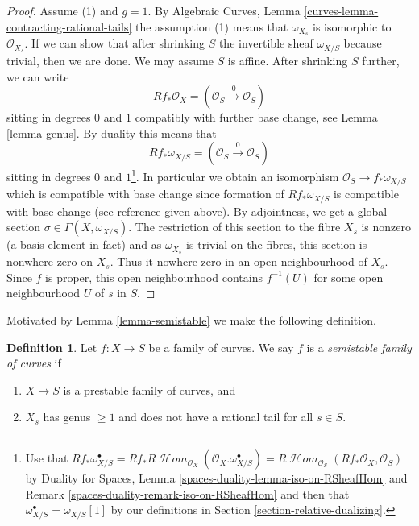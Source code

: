\documentclass{stacks-project}
\theoremstyle{plain}
\theoremstyle{definition}
\newtheorem{definition}[subsection]{Definition}
\theoremstyle{remark}
\numberwithin{equation}{subsection}
\def\SheafHom{\mathop{\mathcal{H}\!\mathit{om}}\nolimits}
\begin{document}
\begin{proof}
\medskip\noindent
Assume (1) and $g = 1$. By
Algebraic Curves, Lemma \ref{curves-lemma-contracting-rational-tails}
the assumption (1) means that $\omega_{X_s}$ is isomorphic to
$\mathcal{O}_{X_s}$. If we can show that after shrinking $S$
the invertible sheaf $\omega_{X/S}$ because trivial, then
we are done. We may assume $S$ is affine. After shrinking $S$
further, we can write
$$
Rf_*\mathcal{O}_X = (\mathcal{O}_S \xrightarrow{0} \mathcal{O}_S)
$$
sitting in degrees $0$ and $1$
compatibly with further base change, see Lemma \ref{lemma-genus}.
By duality this means that
$$
Rf_*\omega_{X/S} = (\mathcal{O}_S \xrightarrow{0} \mathcal{O}_S)
$$
sitting in degrees $0$ and $1$\footnote{Use that
$Rf_*\omega_{X/S}^\bullet =
Rf_*R\SheafHom_{\mathcal{O}_X}(\mathcal{O}_X. \omega_{X/S}^\bullet) =
R\SheafHom_{\mathcal{O}_S}(Rf_*\mathcal{O}_X, \mathcal{O}_S)$
by Duality for Spaces, Lemma \ref{spaces-duality-lemma-iso-on-RSheafHom} and
Remark \ref{spaces-duality-remark-iso-on-RSheafHom}
and then that $\omega_{X/S}^\bullet = \omega_{X/S}[1]$ by
our definitions in Section \ref{section-relative-dualizing}.}.
In particular we obtain an isomorphism $\mathcal{O}_S \to f_*\omega_{X/S}$
which is compatible with base change since
formation of $Rf_*\omega_{X/S}$ is compatible with base change
(see reference given above).
By adjointness, we get a global section $\sigma \in \Gamma(X, \omega_{X/S})$.
The restriction of this section to the fibre $X_s$
is nonzero (a basis element in fact) and as
$\omega_{X_s}$ is trivial on the fibres,
this section is nonwhere zero on $X_s$.
Thus it nowhere zero in
an open neighbourhood of $X_s$. Since $f$ is proper, this open
neighbourhood contains $f^{-1}(U)$ for some open neighbourhood
$U$ of $s$ in $S$.
\end{proof}

\noindent
Motivated by Lemma \ref{lemma-semistable} we make the following definition.

\begin{definition}
\label{definition-semistable}
Let $f : X \to S$ be a family of curves.
We say $f$ is a {\it semistable family of curves} if
\begin{enumerate}
\item $X \to S$ is a prestable family of curves, and
\item $X_s$ has genus $\geq 1$ and
does not have a rational tail for all $s \in S$.
\end{enumerate}
\end{definition}
\end{document}

